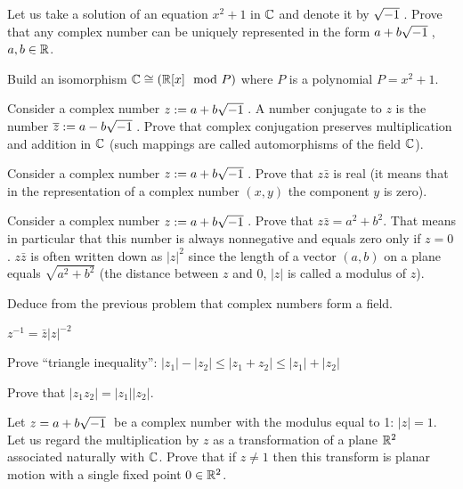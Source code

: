 \documentclass[12pt]{article}
\begin{document}
\begin{zadacha} Let us take a solution of an equation $x^2+1$ in ${\mathbb C}$
  and denote it by $\sqrt{-1}\:$. Prove that any complex number can be uniquely
  represented in the form $a + b \sqrt{-1}\:$, $a,b \in {\mathbb R}$.
\end{zadacha}

\begin{zadacha}
Build an isomorphism ${\mathbb C} \cong ({\mathbb R}[x] \mod P)$ where $P$ is a polynomial
$P= x^2+1$.
\end{zadacha}

\begin{zadacha} Consider a complex number $z:=a+b\sqrt{-1}\:$. A number conjugate
to $z$ is the number $\overline z := a-b\sqrt{-1}\:$. Prove that complex conjugation
preserves multiplication and addition in ${\mathbb C}$ (such mappings are
called automorphisms of the field ${\mathbb C}$).
\end{zadacha}

\begin{zadacha} Consider a complex number $z:=a+b\sqrt{-1}\:$. Prove that 
$z\bar z$ is real (it means that in the representation of a complex
  number $(x,y)$ the component $y$ is zero).
\end{zadacha}

\begin{zadacha} Consider a complex number $z:=a+b\sqrt{-1}\:$. Prove that $z\bar z = a^2
+ b^2$. That means in particular that this number is always nonnegative and
equals zero only if $z = 0$. $z\bar z$ is often written down as $|z|^2$ since
the length of a vector $(a,b)$ on a plane equals $\sqrt{a^2 + b^2}$ (the
distance between $z$ and $0$, $|z|$ is called a modulus of $z$).
\end{zadacha}

\begin{zadacha} 
Deduce from the previous problem that complex numbers form a field.
\end{zadacha}

\begin{ukazanie} $z^{-1} = \bar z |z|^{-2}$
\end{ukazanie}

\begin{zadacha} Prove ``triangle inequality'': 
$|z_1| - |z_2| \leq |z_1 + z_2| \leq |z_1|+ |z_2|$
\end{zadacha}

\begin{zadacha} Prove that $|z_1 z_2| = |z_1||z_2|$.
\end{zadacha}

\begin{zadacha}[!]\label{povorot}
Let $z=a+b\sqrt{-1}\:$ be a complex number with the modulus equal to 1:
$|z|=1$. Let us regard the multiplication by $z$ as a transformation
of a plane ${\mathbb R}^2$ associated naturally with ${\mathbb C}$. Prove that if $z
\neq 1$ then this transform is planar motion with a single fixed point
$0 \in {\mathbb R}^2$.
\end{zadacha}
\end{document}
